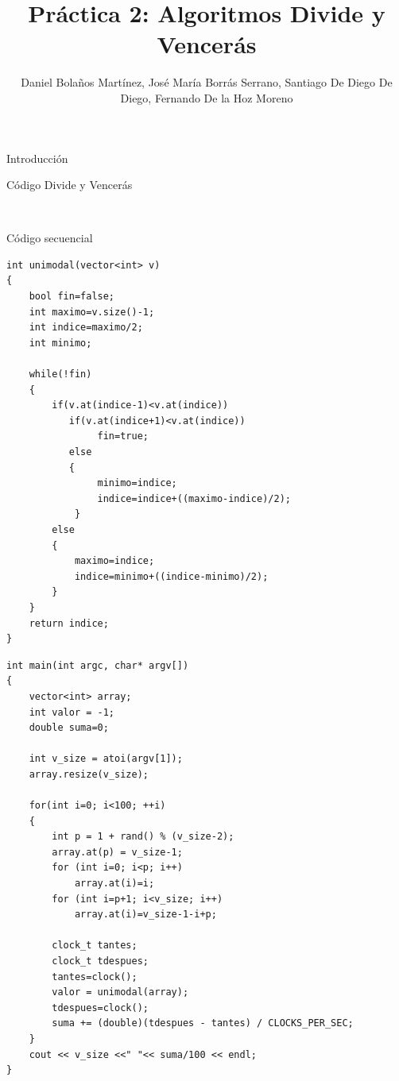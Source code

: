 \documentclass[12pt]{beamer}
\author{Daniel Bolaños Martínez, José María Borrás Serrano, Santiago De Diego De Diego, Fernando De la Hoz Moreno}
\title{Práctica 2: Algoritmos Divide y Vencerás}
\institute{ETSIIT}
\date{}
\begin{document}
\begin{frame}
\titlepage
\end{frame}

\begin{frame}{Introducción}

\end{frame}

\begin{frame}[fragile]{Código Divide y Vencerás}
	\begin{lstlisting}
	
	\end{lstlisting}
\end{frame}

\begin{frame}[fragile]{Código secuencial}
	\begin{lstlisting}
int unimodal(vector<int> v)
{
	bool fin=false;
	int maximo=v.size()-1;
	int indice=maximo/2;
	int minimo;
 
	while(!fin)
	{
        if(v.at(indice-1)<v.at(indice))
           if(v.at(indice+1)<v.at(indice))
			    fin=true;
		   else
		   {
				minimo=indice;
				indice=indice+((maximo-indice)/2);
			}
		else
		{
			maximo=indice;
			indice=minimo+((indice-minimo)/2);
		}
	}
	return indice;
}
	\end{lstlisting}
\end{frame}
\begin{frame}[fragile]
	\begin{lstlisting}
int main(int argc, char* argv[])
{
	vector<int> array;
  	int valor = -1;
	double suma=0;

	int v_size = atoi(argv[1]);
	array.resize(v_size);

	for(int i=0; i<100; ++i)
	{
		int p = 1 + rand() % (v_size-2);
  		array.at(p) = v_size-1;
  		for (int i=0; i<p; i++)
  			array.at(i)=i;
  		for (int i=p+1; i<v_size; i++)
  			array.at(i)=v_size-1-i+p;

		clock_t tantes;
		clock_t tdespues;
		tantes=clock();
		valor = unimodal(array);
		tdespues=clock();
		suma += (double)(tdespues - tantes) / CLOCKS_PER_SEC;
	}
  	cout << v_size <<" "<< suma/100 << endl;
}
	\end{lstlisting}

\end{frame}
\end{document}
